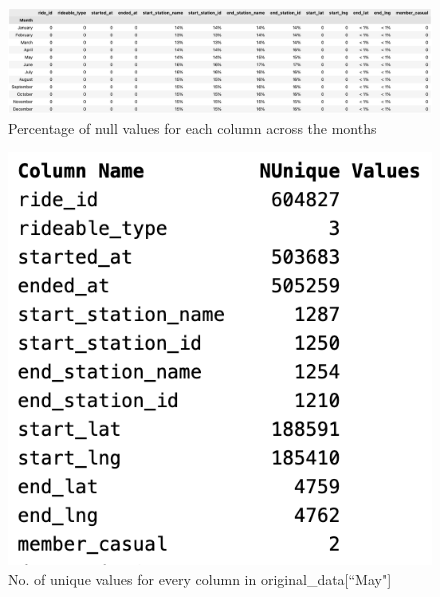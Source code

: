 \documentclass[12pt]{article}
\begin{document}
\begin{itemize}
	\begin{figure}[h]
	\centering
	\includegraphics[width=7.2 in, height = 2.5 in]{imgNAN.png}
	\caption{Percentage of null values for each column across the months}
	\label{fig4}
	\end{figure}
	
	\begin{figure}[h]
	\centering
	\includegraphics[scale = 0.6]{imgUni.png} %
	\caption{No. of unique values for every column in original\_data[``May"]}
	\label{fig2}
	\end{figure}
	

\end{itemize}
\end{document}
